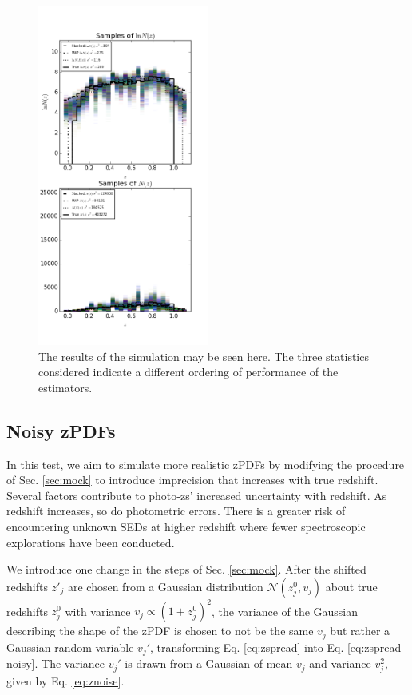 \documentclass[preprint]{aastex}
\begin{document}
\begin{figure}
\includegraphics[width=0.5\textwidth]{samps-real.png}
\caption{The results of the simulation may be seen here.  The three statistics considered indicate a different ordering of performance of the estimators.}
\label{fig:nullparam}
\end{figure}

\clearpage
\subsection{Noisy zPDFs}
\label{sec:noisy}

In this test, we aim to simulate more realistic zPDFs by modifying the procedure of Sec. \ref{sec:mock} to introduce imprecision that increases with true redshift.  Several factors contribute to photo-zs' increased uncertainty with redshift.  As redshift increases, so do photometric errors.  There is a greater risk of encountering unknown SEDs at higher redshift where fewer spectroscopic explorations have been conducted.  

We introduce one change in the steps of Sec. \ref{sec:mock}.  After the shifted redshifts $z'_{j}$ are chosen from a Gaussian distribution $\mathcal{N}(z_{j}^{0},v_{j})$ about true redshifts $z_{j}^{0}$ with variance $v_{j}\propto(1+z_{j}^{0})^{2}$, the variance of the Gaussian describing the shape of the zPDF is chosen to not be the same $v_{j}$ but rather a Gaussian random variable $v_{j}'$, transforming Eq. \ref{eq:zspread} into Eq. \ref{eq:zspread-noisy}.  The variance $v_{j}'$ is drawn from a Gaussian of mean $v_{j}$ and variance $v_{j}^{2}$, given by Eq. \ref{eq:znoise}.
\end{document}
